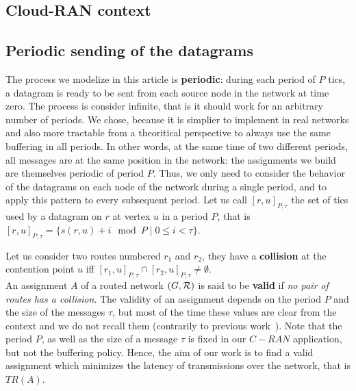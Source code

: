 \documentclass[english]{article}
\begin{document}
  \subsection{Cloud-RAN context}
     

     
  \subsection{Periodic sending of the datagrams}

 	The process we modelize in this article is \textbf{periodic}: during each period of $P$ tics, a datagram is ready to be sent from each source node in the network at time zero. The process is consider infinite, that is it should work for an arbitrary number of periods. We chose, because it is simplier to implement in real networks and also more tractable from a theoritical perspective to always use the same buffering in all periods. In other words, at the same time of two different periods, all messages are at the same position in the network: the assignments we build are themselves periodic of period $P$. Thus, we only need to consider the behavior of the datagrams on each node of the network during a single period, and to apply this pattern to every subsequent period. 
    Let us call $[r,u]_{P,\tau}$ the set of tics used by a datagram on $r$ at vertex $u$ in a period $P$, that is $[r,u]_{P,\tau} = \{s(r,u) + i \mod P \mid 0 \leq i < \tau \}$. 

      Let us consider two routes numbered $r_1$ and $r_2$, they have a {\bf collision} at the contention point $u$ iff $[r_1,u]_{P,\tau} \cap [r_2,u]_{P,\tau} \neq \emptyset$.\\

        An assignment $A$ of a routed network $(G,{\cal R})$ is said to be \textbf{valid} if \emph{no pair of routes has a collision}. 
        The validity of an assignment depends on the period $P$ and the size of the messages $\tau$, but most of the time these values are clear from the context and we do not recall them (contrarily to previous work~\cite{Guir1806:Deterministic}).
        Note that the period $P$, as well as the size of a message $\tau$ is fixed in our $C-RAN$ application, but not the buffering policy. Hence, the aim of our work is to find a valid assignment which minimizes the latency of transmissions over the network, that is $TR(A)$.
        
\end{document}
